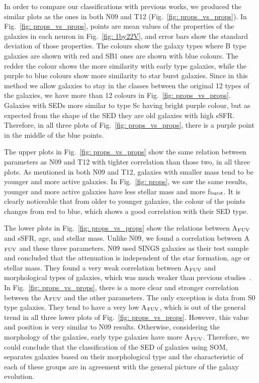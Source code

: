         In order to compare our classifications with previous works, we produced the similar plots as the ones in both N09 and T12 (Fig.~\ref{fig: props_vs_props}).
        In Fig.~\ref{fig: props_vs_props}, points are mean values of the properties of the galaxies in each neuron in Fig.~\ref{fig: 1by22V}, and error bars show the standard deviation of those properties. 
        The colours show the galaxy types where B type galaxies are shown with red and SB1 ones are shown with blue colours.
        The redder the colour shows the more similarity with early type galaxies, while the purple to blue colours show more similarity to star burst galaxies.
        Since in this method we allow galaxies to stay in the classes between the original 12 types of the galaxies, we have more than 12 colours in Fig.~\ref{fig: props_vs_props}.
        Galaxies with SEDs more similar to type Sc having bright purple colour, but as expected from the shape of the SED they are old galaxies with high sSFR.
        Therefore, in all three plots of Fig.~\ref{fig: props_vs_props}, there is a purple point in the middle of the blue points.
        
        The upper plots in Fig.~\ref{fig: props_vs_props} show the same relation between parameters as N09 and T12 with tighter correlation than those two, in all three plots.
        As mentioned in both N09 and T12, galaxies with smaller mass tend to be younger and more active galaxies.
        In Fig.~\ref{fig: props}, we saw the same results, younger and more active galaxies have less stellar mass and more f$_{\rm {burst}}$.
        It is clearly noticeable that from older to younger galaxies, the colour of the points changes from red to blue, which shows a good correlation with their SED type.
        
        The lower plots in Fig.~\ref{fig: props_vs_props} show the relations between A$_{\rm {FUV}}$ and sSFR, age, and stellar mass.
        Unlike N09, we found a correlation between A$_{\rm {FUV}}$ and these three parameters.
        N09 used SINGS galaxies as their test sample and concluded that the attenuation is independent of the star formation, age or stellar mass.
        They found a very weak correlation between A$_{\rm {FUV}}$ and morphological types of galaxies, which was much weaker than previous studies~\citep[e.g.][]{Dale07}.
        In Fig.~\ref{fig: props_vs_props}, there is a more clear and stronger correlation between the A$_{\rm {FUV}}$ and the other parameters.
        The only exception is data from S0 type galaxies.
        They tend to have a very low A$_{\rm {FUV}}$, which is out of the general trend in all three lower plots of Fig.~\ref{fig: props_vs_props}.
        However, this value and position is very similar to N09 results.
        Otherwise, considering the morphology of the galaxies, early type galaxies have more A$_{\rm {FUV}}$.
        Therefore, we could conclude that the classification of the SED of galaxies using SOM, separates galaxies based on their morphological type and the characteristic of each of these groups are in agreement with the general picture of the galaxy evolution.


